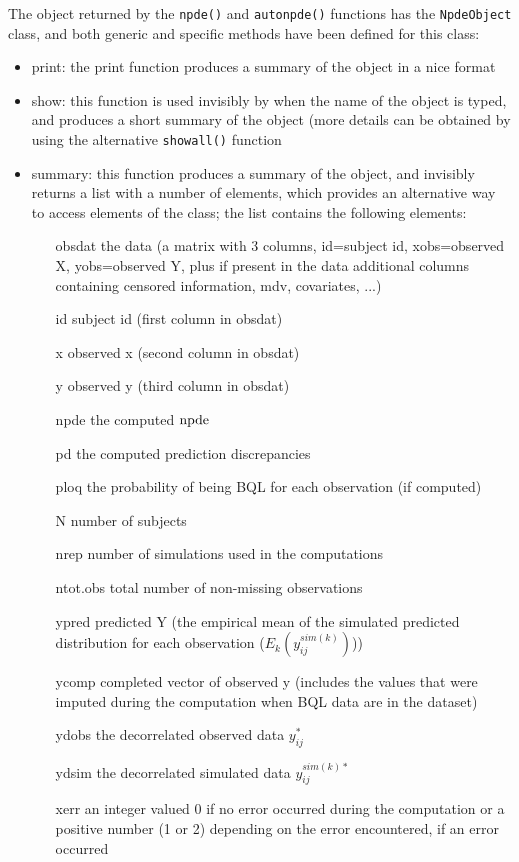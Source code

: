 The object returned by the \texttt{npde()} and \texttt{autonpde()} functions has the \texttt{NpdeObject} class, and both generic and specific methods have been defined for this class:
\begin{itemize}
\item print: the print function produces a summary of the object in a nice format
\item show: this function is used invisibly by \R when the name of the object is typed, and produces a short summary of the object (more details can be obtained by using the alternative \texttt{showall()} function
\item summary: this function produces a summary of the object, and invisibly returns a list with a number of elements, which provides an alternative way to access elements of the class; the list contains the following elements:
   \begin{itemize}
   \item[obsdat] the data (a matrix with 3 columns, id=subject id, xobs=observed X, yobs=observed Y, plus if present in the data additional columns containing censored information, mdv, covariates, ...)
   \item[id] subject id (first column in obsdat)
   \item[x] observed x (second column in obsdat)
   \item[y] observed y (third column in obsdat)
   \item[npde] the computed ${\rm npde}$
   \item[pd] the computed prediction discrepancies
   \item[ploq] the probability of being BQL for each observation (if computed)
   \item[N] number of subjects
   \item[nrep] number of simulations used in the computations
   \item[ntot.obs] total number of non-missing observations
   \item[ypred] predicted Y (the empirical mean of the simulated predicted distribution for each observation ($E_k(y^{sim(k)}_{ij})$))
   \item[ycomp] completed vector of observed y (includes the values that were imputed during the computation when BQL data are in the dataset) 
   \item[ydobs] the decorrelated observed data $y_{ij}^*$
   \item[ydsim] the decorrelated simulated data $y^{sim(k)*}_{ij}$
   \item[xerr] an integer valued 0 if no error occurred during the computation or a positive number (1 or 2) depending on the error encountered, if an error occurred

\end{itemize}
\end{itemize}
